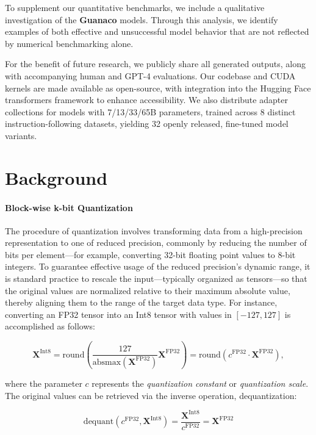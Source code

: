 To supplement our quantitative benchmarks, we include a qualitative investigation of the \textbf{Guanaco} models. Through this analysis, we identify examples of both effective and unsuccessful model behavior that are not reflected by numerical benchmarking alone.

For the benefit of future research, we publicly share all generated outputs, along with accompanying human and GPT-4 evaluations. Our codebase and CUDA kernels are made available as open-source, with integration into the Hugging Face transformers framework \citep{wolf2019huggingface} to enhance accessibility. We also distribute adapter collections for models with 7/13/33/65B parameters, trained across 8 distinct instruction-following datasets, yielding 32 openly released, fine-tuned model variants.

\section{Background}
\paragraph{Block-wise k-bit Quantization} The procedure of quantization involves transforming data from a high-precision representation to one of reduced precision, commonly by reducing the number of bits per element—for example, converting 32-bit floating point values to 8-bit integers. To guarantee effective usage of the reduced precision's dynamic range, it is standard practice to rescale the input—typically organized as tensors—so that the original values are normalized relative to their maximum absolute value, thereby aligning them to the range of the target data type. For instance, converting an FP32 tensor into an Int8 tensor with values in $[-127, 127]$ is accomplished as follows:

\begin{equation}
    \mathbf{X}^{ \text{Int8}} = \text{round}\left( \frac{127}{{\text{absmax}}(\mathbf{X}^{{\text{FP32}}})}\mathbf{X}^{{\text{FP32}}} \right) = \text{round}(c^{\text{FP32}}\cdot \mathbf{X}^{{\text{FP32}}}),
\end{equation}

where the parameter $c$ represents the {\em quantization constant} or {\em quantization scale}. The original values can be retrieved via the inverse operation, dequantization:

\begin{equation}
    \text{dequant}(c^{\text{FP32}}, \mathbf{X}^{\text{Int8}}) = \frac{\mathbf{X}^{\text{Int8}}}{c^{\text{FP32}}} = \mathbf{X}^{\text{FP32}}
\end{equation}

